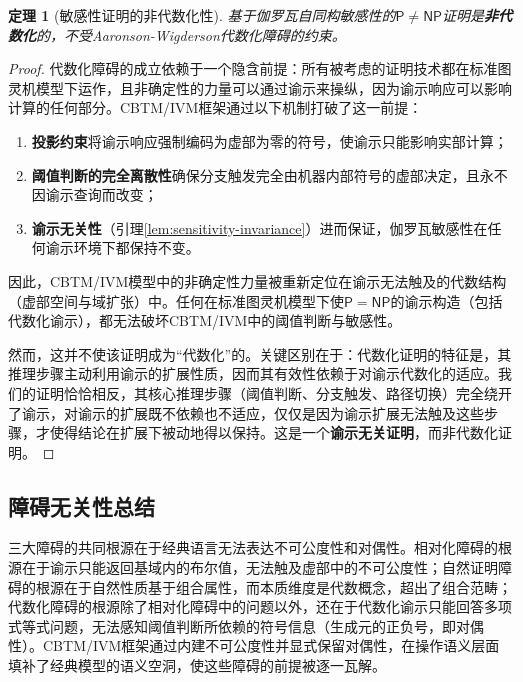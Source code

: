 \documentclass{ctexart}
\newtheorem{theorem}{定理}[section]
\newtheorem{proof}[theorem]{证明}
\begin{document}
	\begin{theorem}[敏感性证明的非代数化性]\label{thm:non-algebrizing}
		基于伽罗瓦自同构敏感性的$\mathsf{P} \neq \mathsf{NP}$证明是\textbf{非代数化}的，不受Aaronson-Wigderson代数化障碍的约束。
	\end{theorem}
	\begin{proof}
		代数化障碍的成立依赖于一个隐含前提：所有被考虑的证明技术都在标准图灵机模型下运作，且非确定性的力量可以通过谕示来操纵，因为谕示响应可以影响计算的任何部分。CBTM/IVM框架通过以下机制打破了这一前提：
		\begin{enumerate}
			\item \textbf{投影约束}将谕示响应强制编码为虚部为零的符号，使谕示只能影响实部计算；
			\item \textbf{阈值判断的完全离散性}确保分支触发完全由机器内部符号的虚部决定，且永不因谕示查询而改变；
			\item \textbf{谕示无关性}（引理\ref{lem:sensitivity-invariance}）进而保证，伽罗瓦敏感性在任何谕示环境下都保持不变。
		\end{enumerate}
		
		因此，CBTM/IVM模型中的非确定性力量被重新定位在谕示无法触及的代数结构（虚部空间与域扩张）中。任何在标准图灵机模型下使$\mathsf{P} = \mathsf{NP}$的谕示构造（包括代数化谕示），都无法破坏CBTM/IVM中的阈值判断与敏感性。
		
		然而，这并不使该证明成为``代数化''的。关键区别在于：代数化证明的特征是，其推理步骤主动利用谕示的扩展性质，因而其有效性依赖于对谕示代数化的适应。我们的证明恰恰相反，其核心推理步骤（阈值判断、分支触发、路径切换）完全绕开了谕示，对谕示的扩展既不依赖也不适应，仅仅是因为谕示扩展无法触及这些步骤，才使得结论在扩展下被动地得以保持。这是一个\textbf{谕示无关证明}，而非代数化证明。
	\end{proof}
	
	\subsection{障碍无关性总结}
	
	三大障碍的共同根源在于经典语言无法表达不可公度性和对偶性。相对化障碍的根源在于谕示只能返回基域内的布尔值，无法触及虚部中的不可公度性；自然证明障碍的根源在于自然性质基于组合属性，而本质维度是代数概念，超出了组合范畴；代数化障碍的根源除了相对化障碍中的问题以外，还在于代数化谕示只能回答多项式等式问题，无法感知阈值判断所依赖的符号信息（生成元的正负号，即对偶性）。CBTM/IVM框架通过内建不可公度性并显式保留对偶性，在操作语义层面填补了经典模型的语义空洞，使这些障碍的前提被逐一瓦解。
	
\end{document}
